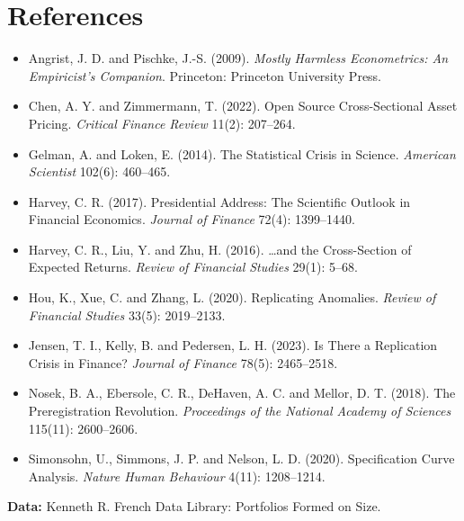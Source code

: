 \section*{References}

\begin{itemize}
  \item Angrist, J. D. and Pischke, J.-S. (2009). \emph{Mostly Harmless Econometrics: An Empiricist's Companion}. Princeton: Princeton University Press.
  \item Chen, A. Y. and Zimmermann, T. (2022). Open Source Cross-Sectional Asset Pricing. \emph{Critical Finance Review} 11(2): 207--264.
  \item Gelman, A. and Loken, E. (2014). The Statistical Crisis in Science. \emph{American Scientist} 102(6): 460--465.
  \item Harvey, C. R. (2017). Presidential Address: The Scientific Outlook in Financial Economics. \emph{Journal of Finance} 72(4): 1399--1440.
  \item Harvey, C. R., Liu, Y. and Zhu, H. (2016). \ldots and the Cross-Section of Expected Returns. \emph{Review of Financial Studies} 29(1): 5--68.
  \item Hou, K., Xue, C. and Zhang, L. (2020). Replicating Anomalies. \emph{Review of Financial Studies} 33(5): 2019--2133.
  \item Jensen, T. I., Kelly, B. and Pedersen, L. H. (2023). Is There a Replication Crisis in Finance? \emph{Journal of Finance} 78(5): 2465--2518.
  \item Nosek, B. A., Ebersole, C. R., DeHaven, A. C. and Mellor, D. T. (2018). The Preregistration Revolution. \emph{Proceedings of the National Academy of Sciences} 115(11): 2600--2606.
  \item Simonsohn, U., Simmons, J. P. and Nelson, L. D. (2020). Specification Curve Analysis. \emph{Nature Human Behaviour} 4(11): 1208--1214.
\end{itemize}

\textbf{Data:} Kenneth R. French Data Library: Portfolios Formed on Size.
